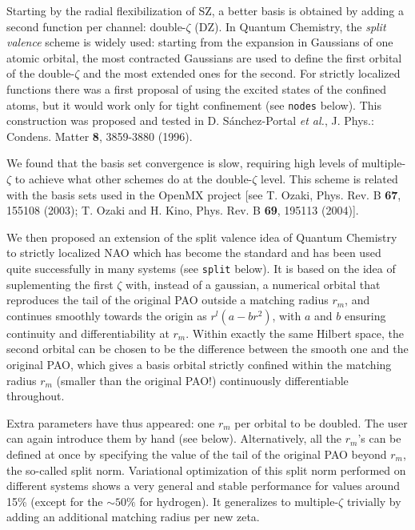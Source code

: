   Starting by the radial flexibilization of SZ, a better basis is obtained
by adding a second function per channel: double-$\zeta$ (DZ).
  In Quantum Chemistry, the \textit{split valence} scheme
is widely used: starting from the expansion in Gaussians of one atomic
orbital, the most contracted Gaussians are used to define the first
orbital of the double-$\zeta$ and the most extended ones for the second.
  For strictly localized functions there was a first proposal
of using the excited states of the confined atoms, but it would work only
for tight confinement (see  \texttt{nodes} below).
  This construction was proposed and tested in D. S\'anchez-Portal
\textit{et al.}, J. Phys.: Condens. Matter \textbf{8}, 3859-3880 (1996).

  We found that the basis set convergence is slow, requiring high levels
of multiple-$\zeta$ to achieve what other schemes do at the double-$\zeta$
level.
  This scheme is related with the basis sets used in the OpenMX project
[see T. Ozaki, Phys. Rev. B \textbf{67}, 155108 (2003); T. Ozaki and H. Kino,
Phys. Rev. B \textbf{69}, 195113 (2004)].

  We then proposed an extension of the split valence idea of Quantum Chemistry
to strictly localized NAO which has become the standard and has been used
quite successfully in many systems (see  \texttt{split} below).
  It is based on the idea of suplementing the first $\zeta$ with, instead of
a gaussian, a numerical orbital that reproduces the tail of the original PAO
outside a matching radius $r_{m}$, and continues smoothly towards the origin as
$r^l(a-br^2)$, with $a$ and $b$ ensuring continuity and differentiability
at $r_{m}$.
  Within exactly the same
Hilbert space, the second orbital can be chosen to be the difference between
the smooth one and the original PAO, which gives a basis orbital strictly
confined within the matching radius $r_{m}$ (smaller than the
original PAO!) continuously differentiable throughout.

  Extra parameters have thus appeared: one $r_m$ per orbital to be doubled.
The user can again introduce them by hand (see  below).
Alternatively, all the $r_m$'s can be defined at once by specifying
the value of the tail of the original PAO beyond $r_m$, the so-called
split norm. Variational optimization
of this split norm performed on different systems
shows a very general and stable performance for values around
15\% (except for the $\sim 50\%$ for hydrogen).
  It generalizes to multiple-$\zeta$ trivially by adding an additional
matching radius per new zeta.

